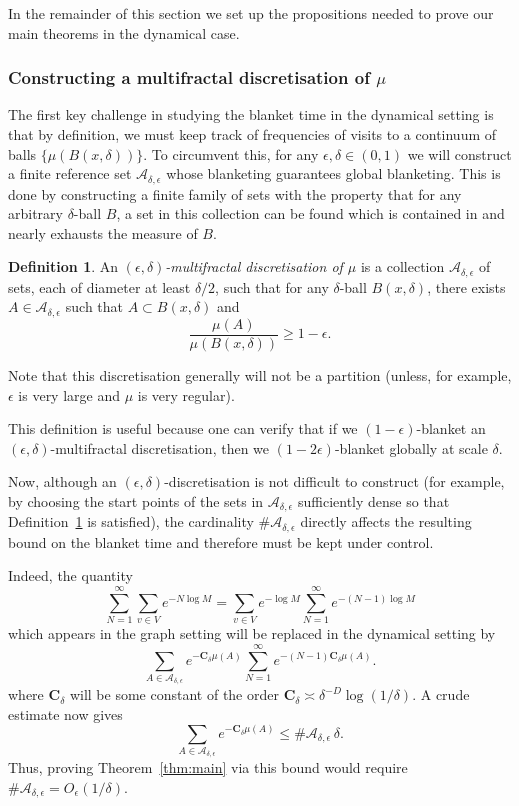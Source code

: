 \documentclass[11pt, reqno]{amsart}
\numberwithin{equation}{section}
\theoremstyle{plain}%
\theoremstyle{definition}
\newtheorem{defn}[thm]{Definition}
\def\A{\ensuremath{\mathscr A}}
\renewcommand{\A}{\mathcal{A}}
\theoremstyle{nonumberplain}
\begin{document}
In the remainder of this section we set up the propositions needed to prove our main theorems in the dynamical case.

\subsubsection{Constructing a multifractal discretisation of $\mu$}

The first key challenge in studying the blanket time in the dynamical setting is that by definition, we must keep track of frequencies of visits to a continuum of balls $\{\mu(B(x, \delta))\}$. To circumvent this, for any $\epsilon, \delta \in (0,1)$ we will construct a finite reference set $\mathcal{A}_{\delta, \epsilon}$ whose blanketing guarantees global blanketing. This is done by constructing a finite family of sets with the property that for any arbitrary $\delta$-ball $B$, a set in this collection can be found which is contained in and nearly exhausts the measure of $B$.

\begin{defn} \label{mfd}
An \emph{$(\epsilon, \delta)$-multifractal discretisation of $\mu$} is a collection $\A_{\delta,\epsilon}$ of sets, each of diameter at least $\delta/2$, such that for any $\delta$-ball $B(x,\delta)$, there exists $A \in \A_{\delta, \epsilon}$ such that $A \subset B(x,\delta)$ and
$$\frac{\mu(A)}{\mu(B(x,\delta))} \geq 1-\epsilon.$$
\end{defn}

Note that this discretisation generally will not be a partition (unless, for example, $\epsilon$ is very large and $\mu$ is very regular).

This definition is useful because one can verify that if we $(1-\epsilon)$-blanket an $(\epsilon, \delta)$-multifractal discretisation, then we $(1-2\epsilon)$-blanket globally at scale $\delta$. 

Now, although an $(\epsilon,\delta)$-discretisation is not difficult to construct
(for example, by choosing the start points of the sets in
$\mathcal{A}_{\delta,\epsilon}$ sufficiently dense so that
Definition~\ref{mfd} is satisfied), the cardinality
$\#\mathcal{A}_{\delta,\epsilon}$ directly affects the resulting bound on the
blanket time and therefore must be kept under control.

Indeed, the quantity
\[
\sum_{N=1}^{\infty} \sum_{v \in V} e^{-N \log M}
  = \sum_{v \in V} e^{-\log M}
    \sum_{N=1}^{\infty} e^{-(N-1)\log M}
\]
which appears in the graph setting will be replaced in the dynamical
setting by
\begin{equation}
\sum_{A \in \mathcal{A}_{\delta,\epsilon}}
  e^{-\mathbf{C}_\delta \mu(A)}
  \sum_{N=1}^{\infty} e^{-(N-1)\mathbf{C}_\delta \mu(A)}.
\label{doublesum}
\end{equation}
where $\mathbf{C}_\delta$ will be some constant of the order $\mathbf{C}_\delta  \asymp \delta^{-D}\log(1/\delta)$. 
A crude estimate now gives
\[
\sum_{A \in \mathcal{A}_{\delta,\epsilon}}
  e^{-\mathbf{C}_\delta \mu(A)}
  \le
  \#\mathcal{A}_{\delta,\epsilon}\,\delta.
\]
Thus, proving Theorem~\ref{thm:main} via this bound would require
$\#\mathcal{A}_{\delta,\epsilon} = O_\epsilon(1/\delta)$.
\end{document}
